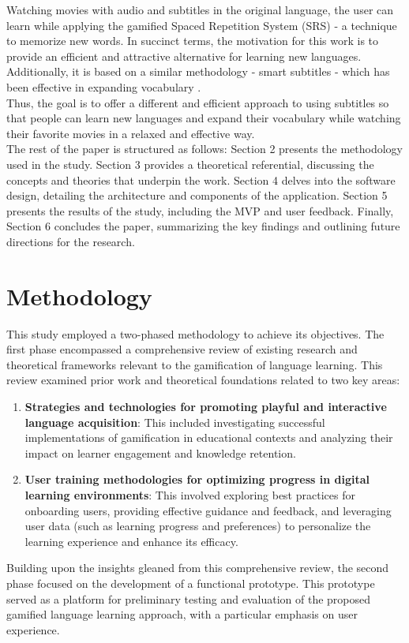 \documentclass[12pt]{article}
\begin{document}
Watching movies with audio and subtitles in the original language, the user can learn while applying the gamified Spaced Repetition System (SRS) - a technique to memorize new words. In succinct terms, the motivation for this work is to provide an efficient and attractive alternative for learning new languages. Additionally, it is based on a similar methodology - smart subtitles - which has been effective in expanding vocabulary \cite{Kovacs14}. \\
Thus, the goal is to offer a different and efficient approach to using subtitles so that people can learn new languages and expand their vocabulary while watching their favorite movies in a relaxed and effective way.\\
The rest of the paper is structured as follows: Section 2 presents the methodology used in the study. Section 3 provides a theoretical referential, discussing the concepts and theories that underpin the work. Section 4 delves into the software design, detailing the architecture and components of the application. Section 5 presents the results of the study, including the MVP and user feedback. Finally, Section 6 concludes the paper, summarizing the key findings and outlining future directions for the research.

\section{Methodology}
This study employed a two-phased methodology to achieve its objectives. The first phase encompassed a comprehensive review of existing research and theoretical frameworks relevant to the gamification of language learning. This review examined prior work and theoretical foundations related to two key areas:
\begin{enumerate}
    \item \textbf{Strategies and technologies for promoting playful and interactive language acquisition}: This included investigating successful implementations of gamification in educational contexts and analyzing their impact on learner engagement and knowledge retention.
    \item \textbf{User training methodologies for optimizing progress in digital learning environments}: This involved exploring best practices for onboarding users, providing effective guidance and feedback, and leveraging user data (such as learning progress and preferences) to personalize the learning experience and enhance its efficacy.
\end{enumerate}
Building upon the insights gleaned from this comprehensive review, the second phase focused on the development of a functional prototype. This prototype served as a platform for preliminary testing and evaluation of the proposed gamified language learning approach, with a particular emphasis on user experience. 
\end{document}
